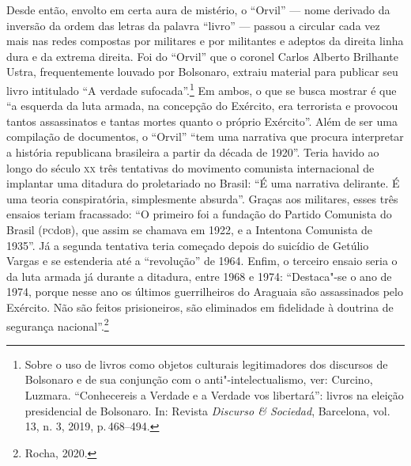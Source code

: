 Desde então, envolto em certa aura de mistério, o ``Orvil'' --- nome
derivado da inversão da ordem das letras da palavra ``livro'' --- passou
a circular cada vez mais nas redes compostas por militares e por
militantes e adeptos da direita linha dura e da extrema direita. Foi do
``Orvil'' que o coronel Carlos Alberto Brilhante Ustra, frequentemente
louvado por Bolsonaro, extraiu material para publicar seu livro
intitulado ``A verdade sufocada''.\footnote{Sobre o uso de livros como
  objetos culturais legitimadores dos discursos de Bolsonaro e de sua
  conjunção com o anti"-intelectualismo, ver: Curcino, Luzmara.
  ``Conhecereis a Verdade e a Verdade vos libertará'': livros na eleição
  presidencial de Bolsonaro. In: Revista \emph{Discurso \& Sociedad},
  Barcelona, vol. 13, n. 3, 2019, p.\,468--494.} Em ambos, o que se busca
mostrar é que ``a esquerda da luta armada, na concepção do Exército, era
terrorista e provocou tantos assassinatos e tantas mortes quanto o
próprio Exército''. Além de ser uma compilação de documentos, o
``Orvil'' ``tem uma narrativa que procura interpretar a história
republicana brasileira a partir da década de 1920''. Teria havido ao
longo do século \textsc{xx} três tentativas do movimento comunista internacional
de implantar uma ditadura do proletariado no Brasil: ``É uma narrativa
delirante. É uma teoria conspiratória, simplesmente absurda''. Graças
aos militares, esses três ensaios teriam fracassado: ``O primeiro foi a
fundação do Partido Comunista do Brasil (\textsc{pc}do\textsc{b}), que assim se chamava em
1922, e a Intentona Comunista de 1935''. Já a segunda tentativa teria
começado depois do suicídio de Getúlio Vargas e se estenderia até a
``revolução'' de 1964. Enfim, o terceiro ensaio seria o da luta armada
já durante a ditadura, entre 1968 e 1974: ``Destaca"-se o ano de 1974,
porque nesse ano os últimos guerrilheiros do Araguaia são assassinados
pelo Exército. Não são feitos prisioneiros, são eliminados em fidelidade
à doutrina de segurança nacional''.\footnote{Rocha, 2020.}

